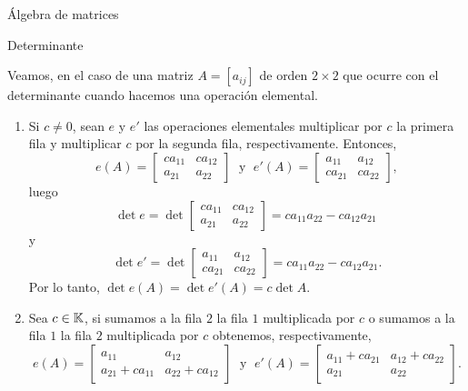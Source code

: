 \begin{chapter}{\'Algebra de matrices}
\begin{section}{Determinante}
    \begin{ejemplo*} Veamos,  en el caso de una matriz $A= [a_{ij}]$ de orden  $2 \times 2$ que ocurre con el determinante cuando hacemos una operación elemental. 
            \begin{enumerate}
            \item Si $c \not=0$, sean $e$ y $e'$ las  operaciones elementales multiplicar por  $c$ la primera fila y multiplicar $c$ por la segunda fila, respectivamente. Entonces,
            \begin{equation*}
            e(A) = \begin{bmatrix} ca_{11}& ca_{12}\\ a_{21}&a_{22}\end{bmatrix}\;\text{ y }\; e'(A) = \begin{bmatrix} a_{11}& a_{12}\\ ca_{21}&ca_{22}\end{bmatrix},
            \end{equation*}
            luego 
            \begin{equation*}  
                \det e = \det \begin{bmatrix} ca_{11}& ca_{12}\\ a_{21}&a_{22}\end{bmatrix} = ca_{11}a_{22} - ca_{12}a_{21}\
            \end{equation*}
            y
            \begin{equation*}
              \det e' =  \det \begin{bmatrix} a_{11}& a_{12}\\ ca_{21}&ca_{22}\end{bmatrix} = ca_{11}a_{22} - ca_{12}a_{21}. 
            \end{equation*}  
            Por lo tanto, $\det e(A) =\det e'(A) = c \det A$. 
            \item Sea  $c \in \mathbb K$, si sumamos a la fila $2$ la fila $1$ multiplicada por $c$ o sumamos a la fila $1$  la fila $2$ multiplicada por $c$ obtenemos, respectivamente,
            \begin{equation*}
            e(A) = \begin{bmatrix} a_{11}& a_{12}\\ a_{21}+ ca_{11}&a_{22}+ ca_{12}\end{bmatrix}\;\text{ y }\; 
            e'(A) = \begin{bmatrix} a_{11} + ca_{21}& a_{12} + ca_{22}\\ a_{21}&a_{22}\end{bmatrix}.

\end{equation*}
\end{enumerate}
\end{ejemplo*}
\end{section}
\end{chapter}
